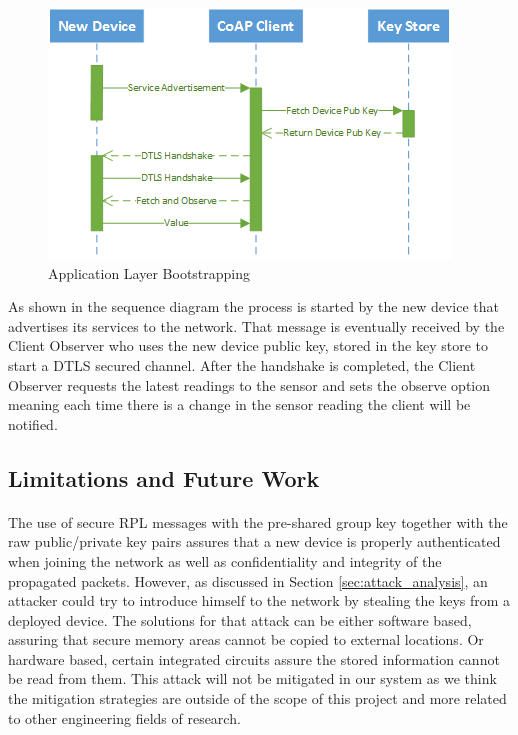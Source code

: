 \begin{figure}[h]
  \centering
  \includegraphics[width=0.8\linewidth]{figures/Sequence_Application_Admission.png}
  \caption{Application Layer Bootstrapping}
  \label{fig:sequence_application_admission}
\end{figure}

As shown in the sequence diagram the process is started by the new device that advertises its services to the network. That message is eventually received by the Client Observer who uses the new device public key, stored in the key store to start a \ac{DTLS} secured channel. After the handshake is completed, the Client Observer requests the latest readings to the sensor and sets the observe option meaning each time there is a change in the sensor reading the client will be notified.

\subsection{Limitations and Future Work}
\paragraph{}

The use of secure RPL messages with the pre-shared group key together with the raw public/private key pairs assures that a new device is properly authenticated when joining the network as well as confidentiality and integrity of the propagated packets. However, as discussed in Section \ref{sec:attack_analysis}, an attacker could try to introduce himself to the network by stealing the keys from a deployed device. The solutions for that attack can be either software based, assuring that secure memory areas cannot be copied to external locations. Or hardware based, certain integrated circuits assure the stored information cannot be read from them. This attack will not be mitigated in our system as we think the mitigation strategies are outside of the scope of this project and more related to other engineering fields of research.\\